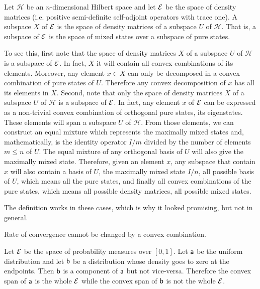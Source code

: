 \begin{example}
	Let $\mathcal{H}$ be an $n$-dimensional Hilbert space and let $\Ens$ be the space of density matrices (i.e. positive semi-definite self-adjoint operators with trace one). A subspace $X$ of $\Ens$ is the space of density matrices of a subspace $U$ of $\mathcal{H}$. That is, a subspace of $\Ens$ is the space of mixed states over a subspace of pure states.
	
	To see this, first note that the space of density matrices $X$ of a subspace $U$ of $\mathcal{H}$ is a subspace of $\Ens$. In fact, $X$ it will contain all convex combinations of its elements. Moreover, any element $x \in X$ can only be decomposed in a convex combination of pure states of $U$. Therefore any convex decomposition of $x$ has all its elements in $X$. Second, note that only the space of density matrices $X$ of a subspace $U$ of $\mathcal{H}$ is a subspace of $\Ens$. In fact, any element $x$ of $\Ens$ can be expressed as a non-trivial convex combination of orthogonal pure states, its eigenstates. These elements will span a subspace $U$ of $\mathcal{H}$. From those elements, we can construct an equal mixture which represents the maximally mixed states and, mathematically, is the identity operator $I/m$ divided by the number of elements $m \leq n$ of $U$. The equal mixture of any orthogonal basis of $U$ will also give the maximally mixed state. Therefore, given an element $x$, any subspace that contain $x$ will also contain a basis of $U$, the maximally mixed state $I/n$, all possible basis of $U$, which means all the pure states, and finally all convex combinations of the pure states, which means all possible density matrices, all possible mixed states.
\end{example}

The definition works in these cases, which is why it looked promising, but not in general.

\begin{insight}
	Rate of convergence cannot be changed by a convex combination.
\end{insight}

\begin{prop}
	Let $\Ens$ be the space of probability measures over $[0,1]$. Let $\ens[a]$ be the uniform distribution and let $\ens[b]$ be a distribution whose density goes to zero at the endpoints. Then $\ens[b]$ is a component of $\ens[a]$ but not vice-versa. Therefore the convex span of $\ens[a]$ is the whole $\Ens$ while the convex span of $\ens[b]$ is not the whole $\Ens$.
\end{prop}

